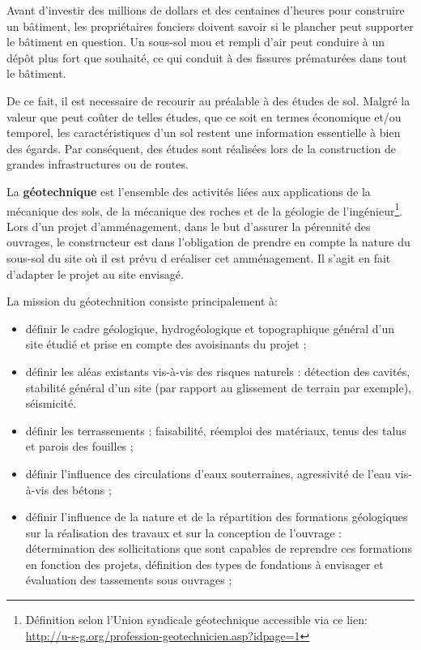 \par
Avant d’investir des millions de dollars et des centaines d’heures pour 
construire un bâtiment, les propriétaires fonciers doivent savoir si le 
plancher peut supporter le bâtiment en question. Un sous-sol mou et 
rempli d'air peut conduire à un dépôt plus fort que souhaité, ce qui 
conduit à des fissures prématurées dans tout le bâtiment.
\par
De ce fait, il est necessaire de recourir au préalable à des études de sol.   
Malgré la valeur que peut coûter de telles études, que ce soit en termes
économique et/ou temporel, les caractéristiques d’un sol restent une
information essentielle à bien des égards. Par conséquent, des études sont 
réalisées lors de la construction de grandes infrastructures ou de routes. 
\par 
La \textbf{géotechnique} est l’ensemble des 
activités liées aux applications de la mécanique des sols, de la mécanique 
des roches et de la géologie de l’ingénieur\footnote{
    Définition selon l’Union syndicale géotechnique accessible via ce lien: 
    \url{http://u-s-g.org/profession-geotechnicien.asp?idpage=1}}.
Lors d'un projet d'amménagement, dans le but d'assurer  la pérennité
des ouvrages, le constructeur est dans l'obligation de prendre en compte
la nature du sous-sol du site où il est prévu d eréaliser cet amménagement.
Il s'agit en fait d'adapter le projet au site envisagé.
\par
La mission du géotechnition consiste principalement à:
\begin{itemize}
    \item définir le cadre géologique, hydrogéologique et topographique 
    général d’un site étudié et prise en compte des avoisinants du projet ;
    \item définir les aléas existants vis-à-vis des risques naturels : 
    détection des cavités, stabilité général d’un site (par rapport au 
    glissement de terrain par exemple), séismicité.
    \item définir les terrassements : faisabilité, réemploi des matériaux, 
    tenus des talus et parois des fouilles ;
    \item définir l’influence des circulations d’eaux souterraines, 
    agressivité de l’eau vis-à-vis des bétons ;
    \item définir l’influence de la nature et de la répartition des 
    formations géologiques sur la réalisation des travaux et sur la conception 
    de l’ouvrage : détermination des sollicitations que sont capables de reprendre 
    ces formations en fonction des projets, définition des types de fondations à 
    envisager et évaluation des tassements sous ouvrages ;
\end{itemize}
